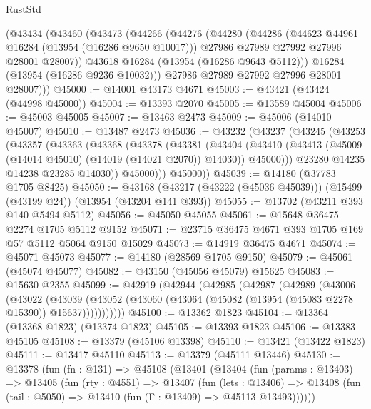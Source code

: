 \begin{lexlean}{RustStd}
\begin{coremodule}
    (@43434
      (@43460
        (@43473
          (@44266
            (@44276
              (@44280
                (@44286
                  (@44623 @44961 @16284 (@13954 (@16286 @9650 @10017)))
                  @27986
                  @27989
                  @27992
                  @27996
                  @28001
                  @28007))
              @43618
              @16284
              (@13954 (@16286 @9643 @5112)))
            @16284
            (@13954 (@16286 @9236 @10032)))
          @27986
          @27989
          @27992
          @27996
          @28001
          @28007)))
@45000 := @14001 @43173 @4671
@45003 := @43421 (@43424 (@44998 @45000))
@45004 := @13393 @2070
@45005 := @13589 @45004
@45006 := @45003 @45005
@45007 := @13463 @2473
@45009 := @45006 (@14010 @45007)
@45010 := @13487 @2473
@45036 := @43232
    (@43237
      (@43245
        (@43253
          (@43357
            (@43363
              (@43368
                (@43378
                  (@43381
                    (@43404
                      (@43410
                        (@43413 (@45009 (@14014 @45010) (@14019 (@14021 @2070)) @14030))
                        @45000)))
                  @23280
                  @14235
                  @14238
                  @23285
                  @14030))
              @45000)))
        @45000))
@45039 := @14180 (@37783 @1705 @8425)
@45050 := @43168 (@43217 (@43222 (@45036 @45039))) (@15499 (@43199 @24)) (@13954 (@43204 @141 @393))
@45055 := @13702 (@43211 @393 @140 @5494 @5112)
@45056 := @45050 @45055
@45061 := @15648 @36475 @2274 @1705 @5112 @9152
@45071 := @23715 @36475 @4671 @393 @1705 @169 @57 @5112 @5064 @9150 @15029
@45073 := @14919 @36475 @4671
@45074 := @45071 @45073
@45077 := @14180 (@28569 @1705 @9150)
@45079 := @45061 (@45074 @45077)
@45082 := @43150 (@45056 @45079) @15625
@45083 := @15630 @2355
@45099 := @42919
    (@42944
      (@42985
        (@42987
          (@42989
            (@43006
              (@43022
                (@43039
                  (@43052 (@43060 (@43064 (@45082 (@13954 (@45083 @2278 @15390)) @15637)))))))))))
@45100 := @13362 @1823
@45104 := @13364 (@13368 @1823) (@13374 @1823)
@45105 := @13393 @1823
@45106 := @13383 @45105
@45108 := @13379 (@45106 @13398)
@45110 := @13421 (@13422 @1823)
@45111 := @13417 @45110
@45113 := @13379 (@45111 @13446)
@45130 := @13378
    (fun (fn : @131) =>
    @45108
      (@13401
        (@13404
          (fun (params : @13403) =>
          @13405
            (fun (rty : @4551) =>
            @13407
              (fun (lets : @13406) =>
              @13408 (fun (tail : @5050) => @13410 (fun (Γ : @13409) => @45113 @13493))))))

\end{coremodule}
\end{lexlean}
